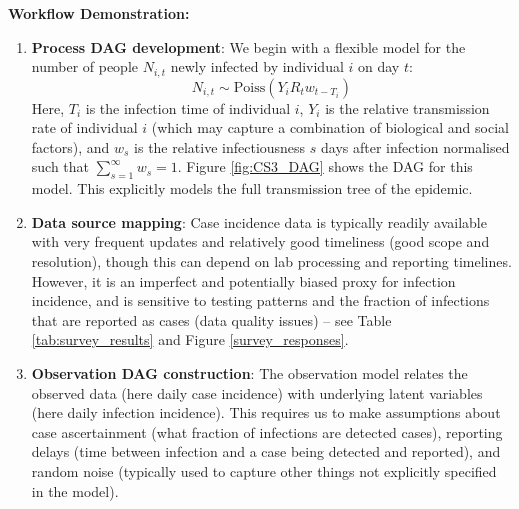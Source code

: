 \documentclass{article}
\begin{document}
\textbf{Workflow Demonstration:}
\begin{enumerate}
    \item \textbf{Process DAG development}: We begin with a flexible model for the number of people $N_{i,t}$ newly infected by individual $i$ on day $t$:
    \begin{equation} \label{eq:individual_level}
         N_{i,t} \sim \mathrm{Poiss} \left( Y_i R_t w_{t-T_i} \right)
    \end{equation} 
    Here, $T_i$ is the infection time of individual $i$, $Y_i$ is the relative transmission rate of individual $i$ (which may capture a combination of biological and social factors), and $w_s$ is the relative infectiousness $s$ days after infection normalised such that $\sum_{s=1}^\infty w_s=1$. Figure \ref{fig:CS3_DAG} shows the DAG for this model. This explicitly models the full transmission tree of the epidemic.
    

\item \textbf{Data source mapping}: Case incidence data is typically readily available with very frequent updates and relatively good timeliness (good scope and resolution), though this can depend on lab processing and reporting timelines. However, it is an imperfect and potentially biased proxy for infection incidence, and is sensitive to testing patterns and the fraction of infections that are reported as cases (data quality issues) -- see Table \ref{tab:survey_results} and Figure \ref{survey_responses}. 


\item \textbf{Observation DAG construction}: The observation model relates the observed data (here daily case incidence) with underlying latent variables (here daily infection incidence). 
This requires us to make assumptions about case ascertainment (what fraction of infections are detected cases), reporting delays (time between infection and a case being detected and reported), and random noise (typically used to capture other things not explicitly specified in the model).


\end{enumerate}
\end{document}
